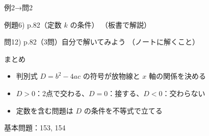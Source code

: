 \documentclass[aspectratio=43,professionalfonts,handout]{beamer}
\begin{document}
\begin{frame}{例2→問2}
  \begin{exampleblock}{例題6) p.82（定数 $k$ の条件）}
    （板書で解説）
  \end{exampleblock}

  \vfill

  \begin{block}{問12) p.82（3問）\quad 自分で解いてみよう}
    （ノートに解くこと）
  \end{block}
\end{frame}

\begin{frame}{まとめ}
  \begin{itemize}
    \item 判別式 $D=b^2-4ac$ の符号が放物線と $x$ 軸の関係を決める
    \item $D>0$：2点で交わる、$D=0$：接する、$D<0$：交わらない
    \item 定数を含む問題は $D$ の条件を不等式で立てる
  \end{itemize}

  \vfill
  {\small 基本問題：153, 154}
\end{frame}
\end{document}
